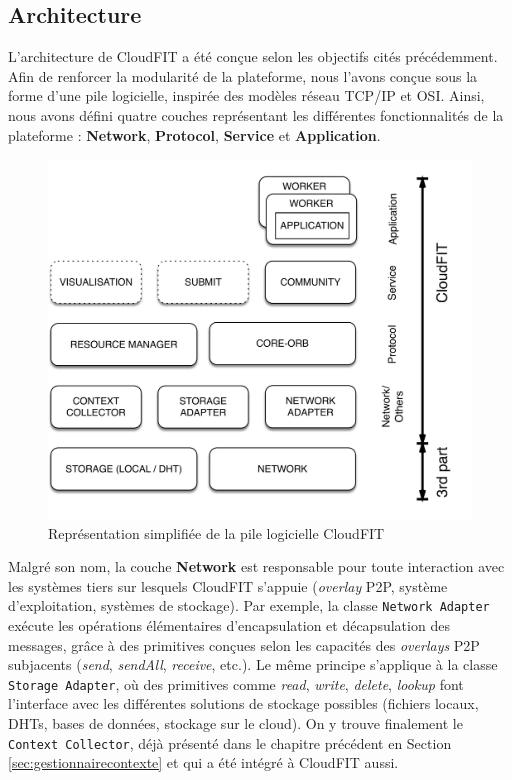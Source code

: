 \subsection{Architecture}

L'architecture de CloudFIT a été conçue selon les objectifs cités précédemment. Afin de renforcer la modularité de la plateforme, nous l'avons conçue sous la forme d'une pile logicielle, inspirée des modèles réseau TCP/IP et OSI. Ainsi, nous avons défini quatre couches représentant les différentes fonctionnalités de la plateforme : \textbf{Network}, \textbf{Protocol}, \textbf{Service} et \textbf{Application}.

\begin{figure}
	\centering
		\includegraphics[width=0.65\linewidth]{img/CloudFITstack}
		\caption{Représentation simplifiée de la pile logicielle CloudFIT}\label{fig:cloudFitStack}
\end{figure}

Malgré son nom, la couche \textbf{Network} est responsable pour toute interaction avec les systèmes tiers sur lesquels CloudFIT s'appuie (\textit{overlay} P2P, système  d'exploitation, systèmes de stockage). Par exemple, la classe \texttt{Network Adapter} exécute les opérations élémentaires d'encapsulation et décapsulation des messages, grâce à des primitives conçues selon les capacités des \textit{overlays} P2P subjacents (\textit{send}, \textit{sendAll}, \textit{receive}, etc.). Le même principe s'applique à la classe \texttt{Storage Adapter}, où des primitives comme \textit{read}, \textit{write}, \textit{delete}, \textit{lookup} font l'interface avec les différentes solutions de stockage possibles (fichiers locaux, DHTs, bases de données, stockage sur le cloud). On y trouve finalement le \texttt{Context Collector}, déjà présenté dans le chapitre précédent en Section \ref{sec:gestionnairecontexte} et qui a été intégré à CloudFIT aussi.

